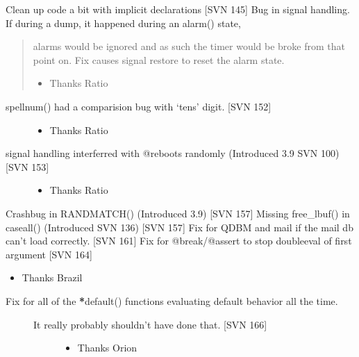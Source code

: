 \documentclass[letterpaper,10pt,english]{sphinxmanual}
\begin{document}
\sphinxAtStartPar
Clean up code a bit with implicit declarations {[}SVN 145{]}
Bug in signal handling.  If during a dump, it happened during an alarm() state,
\begin{quote}

\sphinxAtStartPar
alarms would be ignored and as such the timer would be broke from that point on.
Fix causes signal restore to re\sphinxhyphen{}set the alarm state.
\begin{itemize}
\item {} 
\sphinxAtStartPar
Thanks Ratio

\end{itemize}
\end{quote}
\begin{description}
\item[{spellnum() had a comparision bug with ‘tens’ digit.  {[}SVN 152{]}}] \leavevmode\begin{itemize}
\item {} 
\sphinxAtStartPar
Thanks Ratio

\end{itemize}

\item[{signal handling interferred with @reboots randomly (Introduced 3.9 SVN 100) {[}SVN 153{]}}] \leavevmode\begin{itemize}
\item {} 
\sphinxAtStartPar
Thanks Ratio

\end{itemize}

\end{description}

\sphinxAtStartPar
Crashbug in RANDMATCH() (Introduced 3.9) {[}SVN 157{]}
Missing free\_lbuf() in caseall() (Introduced SVN 136) {[}SVN 157{]}
Fix for QDBM and mail if the mail db can’t load correctly. {[}SVN 161{]}
Fix for @break/@assert to stop double\sphinxhyphen{}eval of first argument {[}SVN 164{]}
\begin{itemize}
\item {} 
\sphinxAtStartPar
Thanks Brazil

\end{itemize}
\begin{description}
\item[{Fix for all of the {\color{red}\bfseries{}*}default() functions evaluating default behavior all the time.}] \leavevmode\begin{description}
\item[{It really probably shouldn’t have done that.  {[}SVN 166{]}}] \leavevmode\begin{itemize}
\item {} 
\sphinxAtStartPar
Thanks Orion

\end{itemize}

\end{description}

\end{description}
\end{document}
